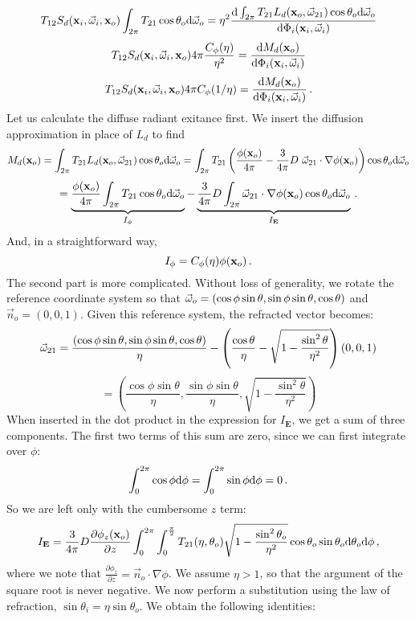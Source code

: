 \documentclass[10pt,a4paper]{article}
\begin{document}
$$
 T_{12} S_d(\mathbf{x}_i, \vec{\omega}_i, \mathbf{x}_o) \int_{2\pi} T_{21} \cos \theta_o \text{d} \vec{\omega}_o =   \eta^2 \frac{\text{d} \int_{2\pi} T_{21}  L_{d}(\mathbf{x}_o, \vec{\omega}_{21}) \cos \theta_o \text{d} \vec{\omega}_o}{\text{d} \Phi_i(\mathbf{x}_i, \vec{\omega}_i)}
$$
$$
 T_{12} S_d(\mathbf{x}_i, \vec{\omega}_i, \mathbf{x}_o) 4\pi\frac{C_{\phi}(\eta)}{\eta^2} =   \frac{\text{d} M_d(\mathbf{x}_o)}{\text{d} \Phi_i(\mathbf{x}_i, \vec{\omega}_i)}
$$
\begin{equation} \label{eq:bssrdf}
 T_{12} S_d(\mathbf{x}_i, \vec{\omega}_i, \mathbf{x}_o) 4\pi C_{\phi}(1/\eta) =   \frac{\text{d} M_d(\mathbf{x}_o)}{\text{d} \Phi_i(\mathbf{x}_i, \vec{\omega}_i)} \, .
\end{equation}
Let us calculate the diffuse radiant exitance first. We insert the diffusion approximation in place of $L_d$ to find
$$
M_d(\mathbf{x}_o) = \int_{2\pi} T_{21}  L_{d}(\mathbf{x}_o, \vec{\omega}_{21}) \cos \theta_o \text{d} \vec{\omega}_o = \int_{2\pi} T_{21}  \left(\frac{\phi(\mathbf{x}_o)}{4\pi} - \frac{3}{4\pi} D\ \vec{\omega}_{21} \cdot \nabla \phi(\mathbf{x}_o)\right) \cos \theta_o \text{d} \vec{\omega}_o
$$
$$
= \underbrace{\frac{\phi(\mathbf{x}_o)}{4\pi} \int_{2\pi} T_{21} \cos \theta_o \text{d} \vec{\omega}_o}_{I_\phi}  - \underbrace{\frac{3}{4\pi} D \int_{2\pi}  \vec{\omega}_{21} \cdot \nabla \phi(\mathbf{x}_o) \cos \theta_o \text{d} \vec{\omega}_o }_{I_{\mathbf{E}}} \, .
$$
And, in a straightforward way,
$$
I_\phi = C_{\phi}(\eta) \phi(\mathbf{x}_o) \, .
$$
The second part is more complicated. Without loss of generality, we rotate the reference coordinate system so that $\vec{\omega}_o = (\cos\phi\sin\theta, \sin\phi \sin\theta, \cos\theta)$ and $\vec{n}_o = (0,0,1)$.  Given this reference system, the refracted vector becomes:
$$
\vec{\omega}_{21} = \frac{(\cos\phi\sin\theta, \sin\phi \sin\theta, \cos\theta)}{\eta} - \left(\frac{\cos\theta}{\eta} - \sqrt{1 - \frac{\sin^2\theta}{\eta^2}}\right) (0,0,1)
$$
$$
= \left(\frac{\cos\phi\sin\theta}{\eta}, \frac{\sin\phi \sin\theta}{\eta},  \sqrt{1 - \frac{\sin^2\theta}{\eta^2}}\right)
$$
When inserted in the dot product in the expression for $I_{\mathbf{E}}$, we get a sum of three components. The first two terms of this sum are zero, since we can first integrate over $\phi$:
$$
\int_0^{2\pi} \cos\phi \text{d} \phi = \int_0^{2\pi} \sin\phi \text{d} \phi = 0 \, .
$$
So we are left only with the cumbersome $z$ term:
$$
I_{\mathbf{E}} = \frac{3}{4\pi} D \frac{\partial \phi_z(\mathbf{x}_o)}{\partial z} \int_{0}^{2\pi}\int_{0}^{\frac{\pi}{2}} T_{21}(\eta,\theta_o) \sqrt{1 - \frac{\sin^2\theta_o}{\eta^2}} \cos \theta_o \sin \theta_o \text{d} \theta_o \text{d} \phi \, ,
$$
where we note that $\frac{\partial \phi_z}{\partial z} = \vec{n}_o\cdot\nabla\phi$. We assume $\eta > 1$, so that the argument of the square root is never negative.  We now perform a substitution using the law of refraction, $\sin\theta_i = \eta \sin\theta_o$. We obtain the following identities:
\end{document}
